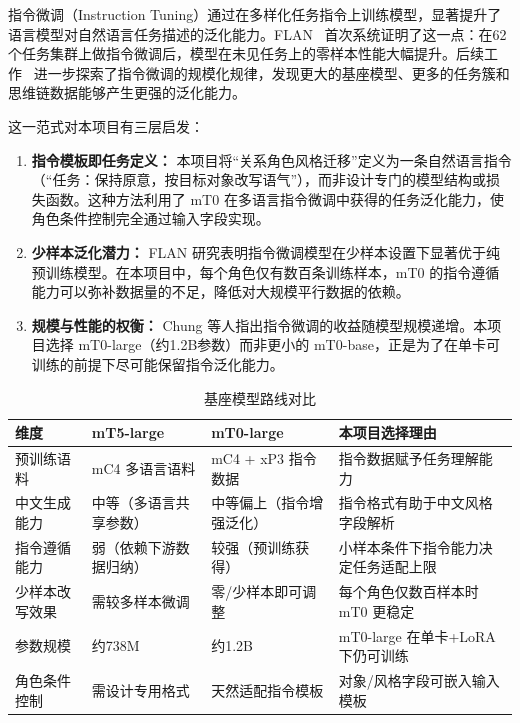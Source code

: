 \documentclass[12pt,a4paper]{ctexart}
\begin{document}
指令微调（Instruction Tuning）通过在多样化任务指令上训练模型，显著提升了语言模型对自然语言任务描述的泛化能力。FLAN~\cite{wei2022flan} 首次系统证明了这一点：在62个任务集群上做指令微调后，模型在未见任务上的零样本性能大幅提升。后续工作~\cite{chung2022scaling} 进一步探索了指令微调的规模化规律，发现更大的基座模型、更多的任务簇和思维链数据能够产生更强的泛化能力。

这一范式对本项目有三层启发：

\begin{enumerate}[leftmargin=2em]
  \item \textbf{指令模板即任务定义：} 本项目将“关系角色风格迁移”定义为一条自然语言指令（“任务：保持原意，按目标对象改写语气”），而非设计专门的模型结构或损失函数。这种方法利用了 mT0 在多语言指令微调中获得的任务泛化能力，使角色条件控制完全通过输入字段实现。
  \item \textbf{少样本泛化潜力：} FLAN 研究表明指令微调模型在少样本设置下显著优于纯预训练模型。在本项目中，每个角色仅有数百条训练样本，mT0 的指令遵循能力可以弥补数据量的不足，降低对大规模平行数据的依赖。
  \item \textbf{规模与性能的权衡：} Chung 等人指出指令微调的收益随模型规模递增。本项目选择 mT0-large（约1.2B参数）而非更小的 mT0-base，正是为了在单卡可训练的前提下尽可能保留指令泛化能力。
\end{enumerate}

\begin{table}[H]
\centering
\caption{基座模型路线对比}
\label{tab:model_comparison}
\begin{tabular}{p{2.3cm}|p{3.2cm}|p{3.2cm}|p{3.5cm}}
\toprule
维度 & mT5-large & mT0-large & 本项目选择理由 \\
\midrule
预训练语料 & mC4 多语言语料 & mC4 + xP3 指令数据 & 指令数据赋予任务理解能力 \\
\midrule
中文生成能力 & 中等（多语言共享参数） & 中等偏上（指令增强泛化） & 指令格式有助于中文风格字段解析 \\
\midrule
指令遵循能力 & 弱（依赖下游数据归纳） & 较强（预训练获得） & 小样本条件下指令能力决定任务适配上限 \\
\midrule
少样本改写效果 & 需较多样本微调 & 零/少样本即可调整 & 每个角色仅数百样本时 mT0 更稳定 \\
\midrule
参数规模 & 约738M & 约1.2B & mT0-large 在单卡+LoRA 下仍可训练 \\
\midrule
角色条件控制 & 需设计专用格式 & 天然适配指令模板 & 对象/风格字段可嵌入输入模板 \\
\bottomrule
\end{tabular}
\end{table}
\end{document}
